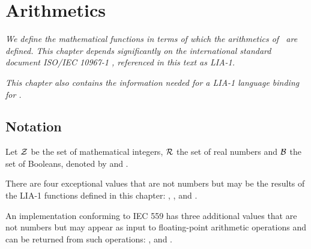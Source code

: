 %
%
%
%
%
%
%

\chapter{Arithmetics}

\label{chapter:arithmetics}

\emph{We define the mathematical functions in terms of which the arithmetics of
\Erlang\ are defined.  This chapter depends significantly on the international
standard document ISO/IEC 10967-1 \cite{lia-1}, referenced in this
text as LIA-1.}

\ifStd
\emph{This chapter also contains the information needed for a
LIA-1 language binding for \StdErlang.}
\fi

\section{Notation}

\label{section:notation-arith}

Let $\mathcal{Z}$ be the set of mathematical integers,
$\mathcal{R}$ the set of
real numbers and $\mathcal{B}$ the set of Booleans, denoted by
and .

There are four exceptional values
that are not numbers but may be the
results of the LIA-1 functions defined in this chapter:
,
,
 and
.

\ifStd
An implementation conforming to IEC 559 \cite{iec559} has three additional values
that are not numbers but may appear as input to floating-point arithmetic operations
and can be returned from such operations:
,
and .
\fi

